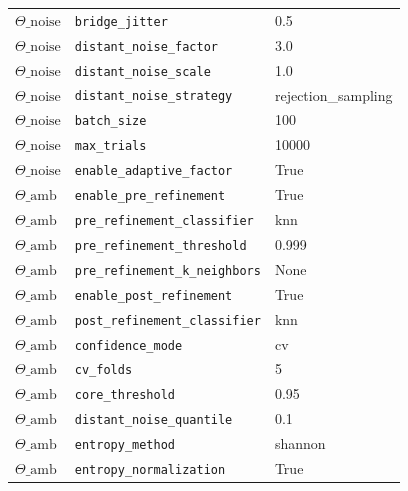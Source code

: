 \begin{tabular}{@{}lll@{}}
$\Theta\_{\text{noise}}$ & \texttt{bridge\_jitter} & 0.5 \\
$\Theta\_{\text{noise}}$ & \texttt{distant\_noise\_factor} & 3.0 \\
$\Theta\_{\text{noise}}$ & \texttt{distant\_noise\_scale} & 1.0 \\
$\Theta\_{\text{noise}}$ & \texttt{distant\_noise\_strategy} & rejection\_sampling \\
$\Theta\_{\text{noise}}$ & \texttt{batch\_size} & 100 \\
$\Theta\_{\text{noise}}$ & \texttt{max\_trials} & 10000 \\
$\Theta\_{\text{noise}}$ & \texttt{enable\_adaptive\_factor} & True \\
$\Theta\_{\text{amb}}$ & \texttt{enable\_pre\_refinement} & True \\
$\Theta\_{\text{amb}}$ & \texttt{pre\_refinement\_classifier} & knn \\
$\Theta\_{\text{amb}}$ & \texttt{pre\_refinement\_threshold} & 0.999 \\
$\Theta\_{\text{amb}}$ & \texttt{pre\_refinement\_k\_neighbors} & None \\
$\Theta\_{\text{amb}}$ & \texttt{enable\_post\_refinement} & True \\
$\Theta\_{\text{amb}}$ & \texttt{post\_refinement\_classifier} & knn \\
$\Theta\_{\text{amb}}$ & \texttt{confidence\_mode} & cv \\
$\Theta\_{\text{amb}}$ & \texttt{cv\_folds} & 5 \\
$\Theta\_{\text{amb}}$ & \texttt{core\_threshold} & 0.95 \\
$\Theta\_{\text{amb}}$ & \texttt{distant\_noise\_quantile} & 0.1 \\
$\Theta\_{\text{amb}}$ & \texttt{entropy\_method} & shannon \\
$\Theta\_{\text{amb}}$ & \texttt{entropy\_normalization} & True \\
\bottomrule
\end{tabular}
